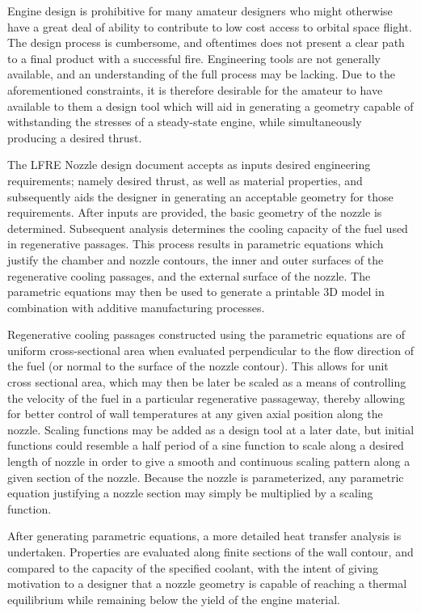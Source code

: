 \documentclass[]{aiaa-tc}%
\begin{document}
Engine design is prohibitive for many amateur designers who might otherwise have a great deal of ability to contribute to low cost access to orbital space flight. The design process is cumbersome, and oftentimes does not present a clear path to a final product with a successful fire.
Engineering tools are not generally available, and an understanding of the full process may be lacking. Due to the aforementioned constraints, it is therefore desirable for the amateur to have available to them a design tool which will aid in generating a geometry capable of withstanding the stresses of a steady-state engine, while simultaneously producing a desired thrust.

The LFRE Nozzle design document accepts as inputs desired engineering requirements; namely desired thrust, as well as material properties, and subsequently aids the designer in generating an acceptable geometry for those requirements. After inputs are provided, the basic geometry of the nozzle is determined. Subsequent analysis determines the cooling capacity of the fuel used in regenerative passages. This process results in parametric equations which justify the chamber and nozzle contours, the inner and outer surfaces of the regenerative cooling passages, and the external surface of the nozzle. The parametric equations may then be used to generate a printable 3D model in combination with additive manufacturing processes.

Regenerative cooling passages constructed using the parametric equations are of uniform cross-sectional area when evaluated perpendicular to the flow direction of the fuel (or normal to the surface of the nozzle contour). This allows for unit cross sectional area, which may then be later be scaled as a means of controlling the velocity of the fuel in a particular regenerative passageway, thereby allowing for better control of wall temperatures at any given axial position along the nozzle. Scaling functions may be added as a design tool at a later date, but initial functions could resemble a half period of a sine function to scale along a desired length of nozzle in order to give a smooth and continuous scaling pattern along a given section of the nozzle. Because the nozzle is parameterized, any parametric equation justifying a nozzle section may simply be multiplied by a scaling function.

After generating parametric equations, a more detailed heat transfer analysis is undertaken. Properties are evaluated along finite sections of the wall contour, and compared to the capacity of the specified coolant, with the intent of giving motivation to a designer that a nozzle geometry is capable of reaching a thermal equilibrium while remaining below the yield of the engine material.
\end{document}

